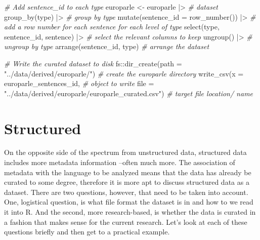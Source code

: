 \documentclass[
  letterpaper,
]{latex/krantz}
\newenvironment{Shaded}{\begin{snugshade}}{\end{snugshade}}
\newcommand{\AttributeTok}[1]{\textcolor[rgb]{0.00,0.00,0.00}{#1}}
\newcommand{\CommentTok}[1]{\textcolor[rgb]{0.00,0.00,0.00}{\textit{#1}}}
\newcommand{\FunctionTok}[1]{\textcolor[rgb]{0.00,0.00,0.00}{#1}}
\newcommand{\NormalTok}[1]{\textcolor[rgb]{0.00,0.00,0.00}{#1}}
\newcommand{\OtherTok}[1]{\textcolor[rgb]{0.00,0.00,0.00}{#1}}
\newcommand{\SpecialCharTok}[1]{\textcolor[rgb]{0.00,0.00,0.00}{#1}}
\newcommand{\StringTok}[1]{\textcolor[rgb]{0.00,0.00,0.00}{#1}}
\begin{document}
\begin{Shaded}
\begin{Highlighting}[]
\CommentTok{\# Add \textasciigrave{}sentence\_id\textasciigrave{} to each \textasciigrave{}type\textasciigrave{}}
\NormalTok{europarle }\OtherTok{\textless{}{-}} 
\NormalTok{  europarle }\SpecialCharTok{|\textgreater{}} \CommentTok{\# dataset}
  \FunctionTok{group\_by}\NormalTok{(type) }\SpecialCharTok{|\textgreater{}} \CommentTok{\# group by type}
  \FunctionTok{mutate}\NormalTok{(}\AttributeTok{sentence\_id =} \FunctionTok{row\_number}\NormalTok{()) }\SpecialCharTok{|\textgreater{}} \CommentTok{\# add a row number for each sentence for each level of type}
  \FunctionTok{select}\NormalTok{(type, sentence\_id, sentence) }\SpecialCharTok{|\textgreater{}} \CommentTok{\# select the relevant columns to keep}
  \FunctionTok{ungroup}\NormalTok{() }\SpecialCharTok{|\textgreater{}}  \CommentTok{\# ungroup by type}
  \FunctionTok{arrange}\NormalTok{(sentence\_id, type) }\CommentTok{\# arrange the dataset}

\CommentTok{\# Write the curated dataset to disk}
\NormalTok{fs}\SpecialCharTok{::}\FunctionTok{dir\_create}\NormalTok{(}\AttributeTok{path =} \StringTok{"../data/derived/europarle/"}\NormalTok{) }\CommentTok{\# create the europarle directory}
\FunctionTok{write\_csv}\NormalTok{(}\AttributeTok{x =}\NormalTok{ europarle\_sentences\_id, }\CommentTok{\# object to write}
          \AttributeTok{file =} \StringTok{"../data/derived/europarle/europarle\_curated.csv"}\NormalTok{) }\CommentTok{\# target file location/ name}
\end{Highlighting}
\end{Shaded}

\hypertarget{structured}{%
\section{Structured}\label{structured}}

On the opposite side of the spectrum from unstructured data, structured
data includes more metadata information --often much more. The
association of metadata with the language to be analyzed means that the
data has already be curated to some degree, therefore it is more apt to
discuss structured data as a dataset. There are two questions, however,
that need to be taken into account. One, logistical question, is what
file format the dataset is in and how to we read it into R. And the
second, more research-based, is whether the data is curated in a fashion
that makes sense for the current research. Let's look at each of these
questions briefly and then get to a practical example.
\end{document}
